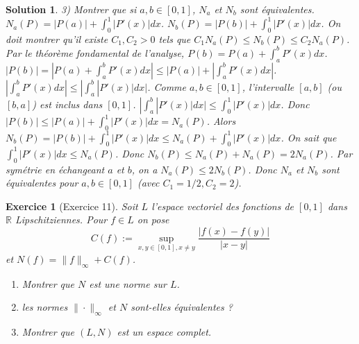 \documentclass{article}
\newtheorem{solution}{Solution}
\newtheorem{exercise}{Exercice} %
\begin{document}
\begin{solution}
3) Montrer que si $a, b \in [0, 1]$, $N_a$ et $N_b$ sont équivalentes.
$N_a(P) = |P(a)| + \int_0^1 |P'(x)| dx$.
$N_b(P) = |P(b)| + \int_0^1 |P'(x)| dx$.
On doit montrer qu'il existe $C_1, C_2 > 0$ tels que $C_1 N_a(P) \le N_b(P) \le C_2 N_a(P)$.
Par le théorème fondamental de l'analyse, $P(b) = P(a) + \int_a^b P'(x) dx$.
$|P(b)| = |P(a) + \int_a^b P'(x) dx| \le |P(a)| + |\int_a^b P'(x) dx|$.
$|\int_a^b P'(x) dx| \le |\int_a^b |P'(x)| dx|$.
Comme $a, b \in [0,1]$, l'intervalle $[a, b]$ (ou $[b, a]$) est inclus dans $[0,1]$.
$|\int_a^b |P'(x)| dx| \le \int_0^1 |P'(x)| dx$.
Donc $|P(b)| \le |P(a)| + \int_0^1 |P'(x)| dx = N_a(P)$.
Alors $N_b(P) = |P(b)| + \int_0^1 |P'(x)| dx \le N_a(P) + \int_0^1 |P'(x)| dx$.
On sait que $\int_0^1 |P'(x)| dx \le N_a(P)$.
Donc $N_b(P) \le N_a(P) + N_a(P) = 2 N_a(P)$.
Par symétrie en échangeant $a$ et $b$, on a $N_a(P) \le 2 N_b(P)$.
Donc $N_a$ et $N_b$ sont équivalentes pour $a, b \in [0,1]$ (avec $C_1=1/2, C_2=2$).
\end{solution}

\begin{exercise}[Exercice 11]
Soit $L$ l'espace vectoriel des fonctions de $[0, 1]$ dans $\mathbb{R}$ Lipschitziennes. Pour $f \in L$ on pose
\[ C(f) := \sup_{x, y \in [0, 1], x \neq y} \frac{|f(x) - f(y)|}{|x - y|} \]
et $N(f) = \|f\|_\infty + C(f)$.
\begin{enumerate}
    \item Montrer que $N$ est une norme sur $L$.
    \item les normes $\| \cdot \|_\infty$ et $N$ sont-elles équivalentes ?
    \item Montrer que $(L, N)$ est un espace complet.
\end{enumerate}
\end{exercise}
\end{document}
